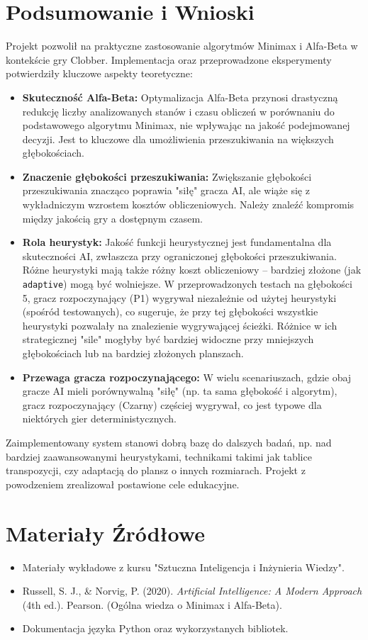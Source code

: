 \documentclass[12pt,a4paper]{article}
\newcommand{\code}[1]{\texttt{#1}} %
\begin{document}
\section{Podsumowanie i Wnioski}
Projekt pozwolił na praktyczne zastosowanie algorytmów Minimax i Alfa-Beta w kontekście gry Clobber. Implementacja oraz przeprowadzone eksperymenty potwierdziły kluczowe aspekty teoretyczne:
\begin{itemize}
    \item \textbf{Skuteczność Alfa-Beta:} Optymalizacja Alfa-Beta przynosi drastyczną redukcję liczby analizowanych stanów i czasu obliczeń w porównaniu do podstawowego algorytmu Minimax, nie wpływając na jakość podejmowanej decyzji. Jest to kluczowe dla umożliwienia przeszukiwania na większych głębokościach.
    \item \textbf{Znaczenie głębokości przeszukiwania:} Zwiększanie głębokości przeszukiwania znacząco poprawia "siłę" gracza AI, ale wiąże się z wykładniczym wzrostem kosztów obliczeniowych. Należy znaleźć kompromis między jakością gry a dostępnym czasem.
    \item \textbf{Rola heurystyk:} Jakość funkcji heurystycznej jest fundamentalna dla skuteczności AI, zwłaszcza przy ograniczonej głębokości przeszukiwania. Różne heurystyki mają także różny koszt obliczeniowy – bardziej złożone (jak \code{adaptive}) mogą być wolniejsze. W przeprowadzonych testach na głębokości 5, gracz rozpoczynający (P1) wygrywał niezależnie od użytej heurystyki (spośród testowanych), co sugeruje, że przy tej głębokości wszystkie heurystyki pozwalały na znalezienie wygrywającej ścieżki. Różnice w ich strategicznej "sile" mogłyby być bardziej widoczne przy mniejszych głębokościach lub na bardziej złożonych planszach.
    \item \textbf{Przewaga gracza rozpoczynającego:} W wielu scenariuszach, gdzie obaj gracze AI mieli porównywalną "siłę" (np. ta sama głębokość i algorytm), gracz rozpoczynający (Czarny) częściej wygrywał, co jest typowe dla niektórych gier deterministycznych.
\end{itemize}
Zaimplementowany system stanowi dobrą bazę do dalszych badań, np. nad bardziej zaawansowanymi heurystykami, technikami takimi jak tablice transpozycji, czy adaptacją do plansz o innych rozmiarach. Projekt z powodzeniem zrealizował postawione cele edukacyjne.

\section*{Materiały Źródłowe}
\begin{itemize}
    \item Materiały wykładowe z kursu "Sztuczna Inteligencja i Inżynieria Wiedzy".
    \item Russell, S. J., \& Norvig, P. (2020). \textit{Artificial Intelligence: A Modern Approach} (4th ed.). Pearson. (Ogólna wiedza o Minimax i Alfa-Beta). %
    \item Dokumentacja języka Python oraz wykorzystanych bibliotek.
\end{itemize}
\end{document}
